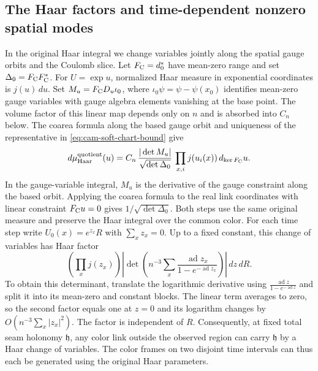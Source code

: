 \documentclass[11pt,a4paper]{article}
\numberwithin{equation}{section}
\newcommand{\hper}{\mathfrak h}
\begin{document}
\subsection{The Haar factors and time-dependent nonzero spatial modes}

In the original Haar integral we change variables jointly along the spatial gauge orbits and the Coulomb slice. Let \(F_{\rm C}=d_0^*\) have mean-zero range and set \(\Delta_0=F_{\rm C}F_{\rm C}^*\). For \(U=\exp u\), normalized Haar measure in exponential coordinates is \(j(u)\,du\). Set \(M_u=F_{\rm C}D_u\iota_0\), where \(\iota_0\psi=\psi-\psi(x_0)\) identifies mean-zero gauge variables with gauge algebra elements vanishing at the base point. The volume factor of this linear map depends only on \(n\) and is absorbed into \(C_n\) below. The coarea formula along the based gauge orbit and uniqueness of the representative in \eqref{eq:cam-soft-chart-bound} give
\begin{equation}
 d\mu_{\rm Haar}^{\rm quotient}(u)
 = C_n\,\frac{|\det M_u|}{\sqrt{\det\Delta_0}}\,
          \prod_{x,i} j(u_i(x))\,d_{\ker F_{\rm C}}u .             \label{eq:cam-soft-coarea}
\end{equation}
In the gauge-variable integral, \(M_u\) is the derivative of the gauge constraint along the based orbit. Applying the coarea formula to the real link coordinates with linear constraint \(F_{\rm C}u=0\) gives \(1/\sqrt{\det\Delta_0}\). Both steps use the same original measure and preserve the Haar integral over the common color. For each time step write \(U_0(x)=e^{z_x}R\) with \(\sum_x z_x=0\). Up to a fixed constant, this change of variables has Haar factor
\begin{equation}
 \left(\prod_xj(z_x)\right)
 \left|\det\left(n^{-3}\sum_x\frac{\operatorname{ad}z_x}
             {1-e^{-\operatorname{ad}z_x}}\right)\right|\,dz\,dR .   \label{eq:cam-soft-time-haar}
\end{equation}
To obtain this determinant, translate the logarithmic derivative using \(\frac{\operatorname{ad}z}{1-e^{-\operatorname{ad}z}}\) and split it into its mean-zero and constant blocks. The linear term averages to zero, so the second factor equals one at \(z=0\) and its logarithm changes by \(O(n^{-3}\sum_x|z_x|^2)\). The factor is independent of \(R\). Consequently, at fixed total seam holonomy \(\hper\), any color link outside the observed region can carry \(\hper\) by a Haar change of variables. The color frames on two disjoint time intervals can thus each be generated using the original Haar parameters.
\end{document}
